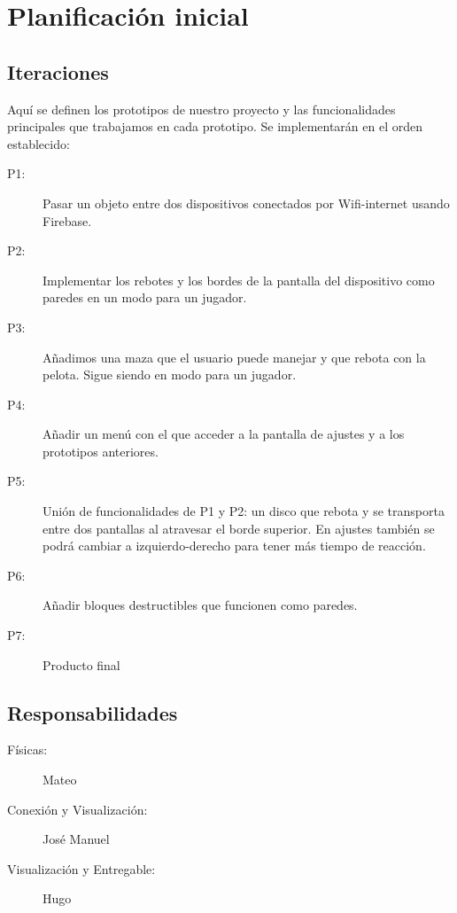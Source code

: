 \documentclass[a4paper,openright,12pt]{article}
\begin{document}
\section{Planificación inicial}

\subsection{Iteraciones}
Aquí se definen los prototipos de nuestro proyecto y las funcionalidades principales que trabajamos en cada prototipo. Se implementarán en el orden establecido:
\begin{description}
\item[P1:] Pasar un objeto entre dos dispositivos conectados por Wifi-internet usando Firebase.
\item[P2:] Implementar los rebotes y los bordes de la pantalla del dispositivo como paredes en un modo para un jugador.
\item[P3:] Añadimos una maza que el usuario puede manejar y que rebota con la pelota. Sigue siendo en modo para un jugador.
\item[P4:] Añadir un menú con el que acceder a la pantalla de ajustes y a los prototipos anteriores.
\item[P5:] Unión de funcionalidades de P1 y P2: un disco que rebota y se transporta entre dos pantallas al atravesar el borde superior. En ajustes también se podrá cambiar a izquierdo-derecho para tener más tiempo de reacción. 
\item[P6:] Añadir bloques destructibles que funcionen como paredes.
\item[P7:] Producto final
\end{description}
\subsection{Responsabilidades}
\begin{description}

\item[Físicas:] Mateo 
\item[Conexión y Visualización:] José Manuel
\item[Visualización y Entregable:] Hugo
\end{description}

\end{document}
